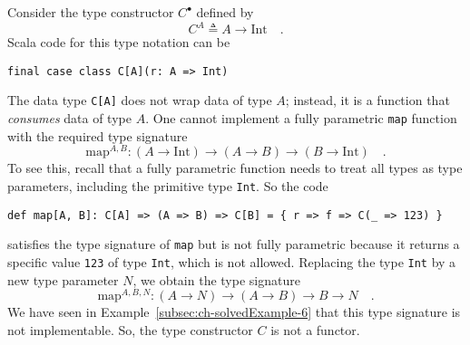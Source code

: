 Consider the type constructor $C^{\bullet}$ defined by
\[
C^{A}\triangleq A\rightarrow\text{Int}\quad.
\]
Scala code for this type notation can be
\begin{lstlisting}
final case class C[A](r: A => Int)
\end{lstlisting}
The data type \lstinline!C[A]! does not wrap data of type $A$; instead,
it is a function that \emph{consumes} data of type $A$. One cannot
implement a fully parametric \lstinline!map! function with the required
type signature 
\[
\text{map}^{A,B}:\left(A\rightarrow\text{Int}\right)\rightarrow\left(A\rightarrow B\right)\rightarrow\left(B\rightarrow\text{Int}\right)\quad.
\]
To see this, recall that a fully
parametric function needs to treat all types as type parameters, including
the primitive type \lstinline!Int!. So the code
\begin{lstlisting}
def map[A, B]: C[A] => (A => B) => C[B] = { r => f => C(_ => 123) }
\end{lstlisting}
satisfies the type signature of \lstinline!map! but is not fully
parametric because it returns a specific value \lstinline!123! of
type \lstinline!Int!, which is not allowed. Replacing the type \lstinline!Int!
by a new type parameter $N$, we obtain the type signature
\[
\text{map}^{A,B,N}:\left(A\rightarrow N\right)\rightarrow\left(A\rightarrow B\right)\rightarrow B\rightarrow N\quad.
\]
We have seen in Example~\ref{subsec:ch-solvedExample-6} that this
type signature is not implementable. So, the type constructor $C$
is not a functor.

